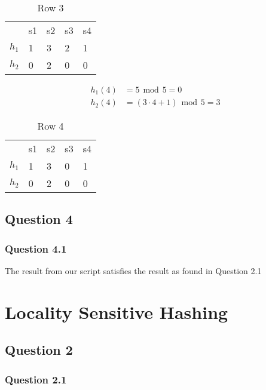 \documentclass[11pt,twoside,a4paper]{article}
\begin{document}
	\begin{table}[h!]
	\centering
	\label{my-label}
	\begin{tabular}{lllll}
	 & s1 & s2 & s3 & s4 \\
	 $h_1$ & 1 & 3 & 2 & 1 \\
	 $h_2$ & 0 & 2 & 0 & 0
	\end{tabular}
	\caption{Row 3}
	\end{table}
	
	\begin{align}
		h_1(4) &= 5 \hspace{5pt} \mbox{mod} \hspace{5pt} 5 = 0 \\
		h_2(4) &= (3 \cdot 4 + 1) \hspace{5pt} \mbox{mod} \hspace{5pt} 5 = 3
	\end{align}
	
	\begin{table}[h!]
	\centering
	\label{my-label}
	\begin{tabular}{lllll}
	 & s1 & s2 & s3 & s4 \\
	 $h_1$ & 1 & 3 & 0 & 1 \\
	 $h_2$ & 0 & 2 & 0 & 0
	\end{tabular}
	\caption{Row 4}
	\end{table}

	
\section{Question 4}

 	\subsection{Question 4.1}
 	The result from our script satisfies the result as found in Question 2.1
 	
 \chapter{Locality Sensitive Hashing}
 
 \section{Question 2}
 
 	\subsection{Question 2.1}
 	 	
\end{document}
